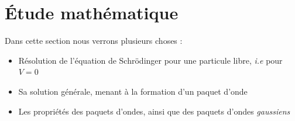 \documentclass[12pt, a4paper]{book}
\begin{document}

\section{Étude mathématique}
Dans cette section nous verrons plusieurs choses :
\begin{itemize}[label= \textbullet]
  \item Résolution de l'équation de Schrödinger pour une particule libre, \textit{i.e} pour $V = 0$
  \item Sa solution générale, menant à la formation d'un paquet d'onde
  \item Les propriétés des paquets d'ondes, ainsi que des paquets d'ondes \textit{gaussiens}
\end{itemize}
\end{document}
